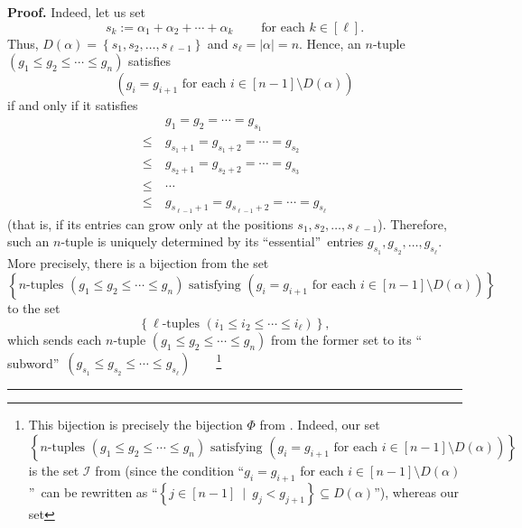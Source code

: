 \documentclass[numbers=enddot,12pt,final,onecolumn,notitlepage]{scrartcl}%
\theoremstyle{definition}
\newenvironment{proof}[1][Proof]{\noindent\textbf{#1.} }{\ \rule{0.5em}{0.5em}}
\newenvironment{vershort}{}{}
\begin{document}
\begin{vershort}
\begin{proof}
Indeed, let us set%
\[
s_{k}:=\alpha_{1}+\alpha_{2}+\cdots+\alpha_{k}\ \ \ \ \ \ \ \ \ \ \text{for
each }k\in\left[  \ell\right]  .
\]
Thus, $D\left(  \alpha\right)  =\left\{  s_{1},s_{2},\ldots,s_{\ell
-1}\right\}  $ and $s_{\ell}=\left\vert \alpha\right\vert =n$. Hence, an
$n$-tuple $\left(  g_{1}\leq g_{2}\leq\cdots\leq g_{n}\right)  $ satisfies%
\[
\left(  g_{i}=g_{i+1}\text{ for each }i\in\left[  n-1\right]  \setminus
D\left(  \alpha\right)  \right)
\]
if and only if it satisfies%
\begin{align*}
&  \ g_{1}=g_{2}=\cdots=g_{s_{1}}\\
\leq &  \ g_{s_{1}+1}=g_{s_{1}+2}=\cdots=g_{s_{2}}\\
\leq &  \ g_{s_{2}+1}=g_{s_{2}+2}=\cdots=g_{s_{3}}\\
\leq &  \ \cdots\\
\leq &  \ g_{s_{\ell-1}+1}=g_{s_{\ell-1}+2}=\cdots=g_{s_{\ell}}%
\end{align*}
(that is, if its entries can grow only at the positions $s_{1},s_{2}%
,\ldots,s_{\ell-1}$). Therefore, such an $n$-tuple is uniquely determined by
its \textquotedblleft essential\textquotedblright\ entries $g_{s_{1}}%
,g_{s_{2}},\ldots,g_{s_{\ell}}$. More precisely, there is a bijection from the
set%
\[
\left\{  n\text{-tuples }\left(  g_{1}\leq g_{2}\leq\cdots\leq g_{n}\right)
\text{ satisfying }\left(  g_{i}=g_{i+1}\text{ for each }i\in\left[
n-1\right]  \setminus D\left(  \alpha\right)  \right)  \right\}
\]
to the set%
\[
\left\{  \ell\text{-tuples }\left(  i_{1}\leq i_{2}\leq\cdots\leq i_{\ell
}\right)  \right\}  ,
\]
which sends each $n$-tuple $\left(  g_{1}\leq g_{2}\leq\cdots\leq
g_{n}\right)  $ from the former set to its \textquotedblleft
subword\textquotedblright\ $\left(  g_{s_{1}}\leq g_{s_{2}}\leq\cdots\leq
g_{s_{\ell}}\right)  $\ \ \ \ \footnote{This bijection is precisely the
bijection $\Phi$ from \cite[detailed version, proof of Proposition
10.69]{Grinbe15}. Indeed, our set%
\[
\left\{  n\text{-tuples }\left(  g_{1}\leq g_{2}\leq\cdots\leq g_{n}\right)
\text{ satisfying }\left(  g_{i}=g_{i+1}\text{ for each }i\in\left[
n-1\right]  \setminus D\left(  \alpha\right)  \right)  \right\}
\]
is the set $\mathcal{I}$ from \cite[detailed version, proof of Proposition
10.69]{Grinbe15} (since the condition \textquotedblleft$g_{i}=g_{i+1}$ for
each $i\in\left[  n-1\right]  \setminus D\left(  \alpha\right)  $%
\textquotedblright\ can be rewritten as \textquotedblleft$\left\{  j\in\left[
n-1\right]  \ \mid\ g_{j}<g_{j+1}\right\}  \subseteq D\left(  \alpha\right)
$\textquotedblright), whereas our set%
}
\end{proof}
\end{vershort}
\end{document}
